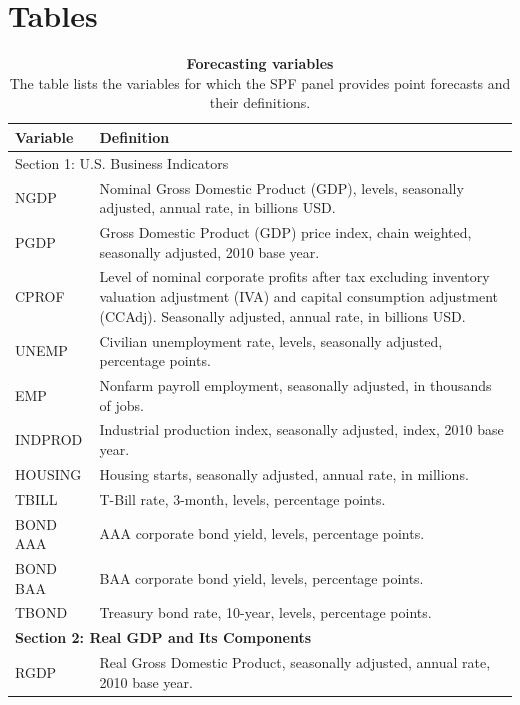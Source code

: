 \documentclass[11pt,letterpaper]{scrartcl}
\begin{document}

\section*{Tables}
\begin{table}[H]
\centering
\caption{
    \textbf{Forecasting variables}
    \vspace{5pt}\\
    \footnotesize{The table lists the variables for which the SPF panel provides point forecasts and their definitions.}}
\label{tab:spf_variables_definitions}
\footnotesize
\begin{tabular}{p{1.8cm}p{14.2cm}}
\toprule
\textbf{Variable} & \textbf{Definition} \\
\hline
\multicolumn{2}{l}{{Section 1: U.S. Business Indicators}} \\
\hline
NGDP & Nominal Gross Domestic Product (GDP), levels, seasonally adjusted, annual rate, in billions USD. \\
PGDP & Gross Domestic Product (GDP) price index, chain weighted, seasonally adjusted, 2010 base year. \\
CPROF & Level of nominal corporate profits after tax excluding inventory valuation adjustment (IVA) and capital consumption adjustment (CCAdj). Seasonally adjusted, annual rate, in billions USD. \\
UNEMP & Civilian unemployment rate, levels, seasonally adjusted, percentage points. \\
EMP & Nonfarm payroll employment, seasonally adjusted, in thousands of jobs. \\
INDPROD & Industrial production index, seasonally adjusted, index, 2010 base year. \\
HOUSING & Housing starts, seasonally adjusted, annual rate, in millions. \\
TBILL & T-Bill rate, 3-month, levels, percentage points. \\
BOND AAA & AAA corporate bond yield, levels, percentage points.  \\
BOND BAA & BAA corporate bond yield, levels, percentage points.  \\
TBOND & Treasury bond rate, 10-year, levels, percentage points. \\
\hline
\multicolumn{2}{l}{\textbf{Section 2: Real GDP and Its Components}} \\
\hline
RGDP & Real Gross Domestic Product, seasonally adjusted, annual rate, 2010 base year. \\

\end{tabular}
\end{table}
\end{document}
